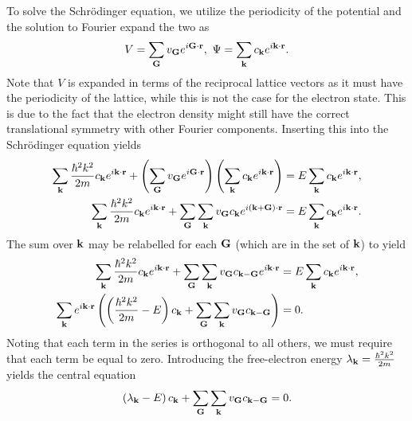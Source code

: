To solve the Schrödinger equation, we utilize the periodicity of the potential and the solution to Fourier expand the two as
\begin{align*}
	V = \sum\limits_{\vb{G}}v_{\vb{G}}e^{i\vb{G}\cdot\vb{r}},\ \Psi = \sum\limits_{\vb{k}}c_{\vb{k}}e^{i\vb{k}\cdot\vb{r}}.
\end{align*}
Note that $V$ is expanded in terms of the reciprocal lattice vectors as it must have the periodicity of the lattice, while this is not the case for the electron state. This is due to the fact that the electron density might still have the correct translational symmetry with other Fourier components. Inserting this into the Schrödinger equation yields
\begin{align*}
	\sum\limits_{\vb{k}}\frac{\hbar^{2}k^{2}}{2m}c_{\vb{k}}e^{i\vb{k}\cdot\vb{r}} + \left(\sum\limits_{\vb{G}}v_{\vb{G}}e^{i\vb{G}\cdot\vb{r}}\right)\left(\sum\limits_{\vb{k}}c_{\vb{k}}e^{i\vb{k}\cdot\vb{r}}\right) &= E\sum\limits_{\vb{k}}c_{\vb{k}}e^{i\vb{k}\cdot\vb{r}}, \\
	\sum\limits_{\vb{k}}\frac{\hbar^{2}k^{2}}{2m}c_{\vb{k}}e^{i\vb{k}\cdot\vb{r}} + \sum\limits_{\vb{G}}\sum\limits_{\vb{k}}v_{\vb{G}}c_{\vb{k}}e^{i(\vb{k} + \vb{G})\cdot\vb{r}} &= E\sum\limits_{\vb{k}}c_{\vb{k}}e^{i\vb{k}\cdot\vb{r}}.
\end{align*}
The sum over $\vb{k}$ may be relabelled for each $\vb{G}$ (which are in the set of $\vb{k}$) to yield
\begin{align*}
	\sum\limits_{\vb{k}}\frac{\hbar^{2}k^{2}}{2m}c_{\vb{k}}e^{i\vb{k}\cdot\vb{r}} + \sum\limits_{\vb{G}}\sum\limits_{\vb{k}}v_{\vb{G}}c_{\vb{k} - \vb{G}}e^{i\vb{k}\cdot\vb{r}} &= E\sum\limits_{\vb{k}}c_{\vb{k}}e^{i\vb{k}\cdot\vb{r}}, \\
	\sum\limits_{\vb{k}}e^{i\vb{k}\cdot\vb{r}}\left(\left(\frac{\hbar^{2}k^{2}}{2m} - E\right)c_{\vb{k}} + \sum\limits_{\vb{G}}\sum\limits_{\vb{k}}v_{\vb{G}}c_{\vb{k} - \vb{G}}\right) &= 0.
\end{align*}
Noting that each term in the series is orthogonal to all others, we must require that each term be equal to zero. Introducing the free-electron energy $\lambda_{\vb{k}} = \frac{\hbar^{2}k^{2}}{2m}$ yields the central equation
\begin{align*}
	\left(\lambda_{\vb{k}} - E\right)c_{\vb{k}} + \sum\limits_{\vb{G}}\sum\limits_{\vb{k}}v_{\vb{G}}c_{\vb{k} - \vb{G}} = 0.
\end{align*}

